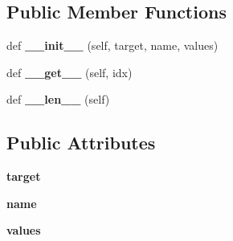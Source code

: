 \subsection*{Public Member Functions}
\begin{DoxyCompactItemize}
\item 
\mbox{\label{classcodar_1_1cheetah_1_1parameters_1_1_param_a4c91917ddd306f143286037d02b78034}} 
def {\bfseries \+\_\+\+\_\+init\+\_\+\+\_\+} (self, target, name, values)
\item 
\mbox{\label{classcodar_1_1cheetah_1_1parameters_1_1_param_ae946fbe90ee7212325e58c9c609b9f60}} 
def {\bfseries \+\_\+\+\_\+get\+\_\+\+\_\+} (self, idx)
\item 
\mbox{\label{classcodar_1_1cheetah_1_1parameters_1_1_param_afe606f18a69519800e93596c1532af8d}} 
def {\bfseries \+\_\+\+\_\+len\+\_\+\+\_\+} (self)
\end{DoxyCompactItemize}
\subsection*{Public Attributes}
\begin{DoxyCompactItemize}
\item 
\mbox{\label{classcodar_1_1cheetah_1_1parameters_1_1_param_a5603d43a20cfc6447c3718406ce0669e}} 
{\bfseries target}
\item 
\mbox{\label{classcodar_1_1cheetah_1_1parameters_1_1_param_ac9982d62cd18a368a3fbc26541e14209}} 
{\bfseries name}
\item 
\mbox{\label{classcodar_1_1cheetah_1_1parameters_1_1_param_aefcc82658f511bddd6605e6ac6e74fbf}} 
{\bfseries values}
\end{DoxyCompactItemize}


